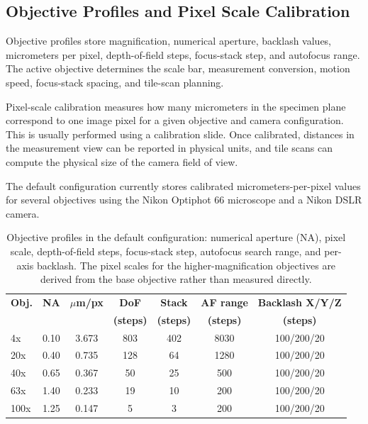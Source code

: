 \subsection{Objective Profiles and Pixel Scale Calibration}

Objective profiles store magnification, numerical aperture, backlash values, micrometers per pixel, depth-of-field steps, focus-stack step, and autofocus range. The active objective determines the scale bar, measurement conversion, motion speed, focus-stack spacing, and tile-scan planning.

Pixel-scale calibration measures how many micrometers in the specimen plane correspond to one image pixel for a given objective and camera configuration. This is usually performed using a calibration slide. Once calibrated, distances in the measurement view can be reported in physical units, and tile scans can compute the physical size of the camera field of view.

The default configuration currently stores calibrated micrometers-per-pixel values for several objectives using the Nikon Optiphot 66 microscope and a Nikon DSLR camera.

\begin{table}[H]
    \centering
    \caption[Objective profile calibration values]{Objective profiles in the default configuration: numerical aperture (NA), pixel scale,
    depth-of-field steps, focus-stack step, autofocus search range, and per-axis backlash. The pixel scales for the higher-magnification objectives are derived from the base objective rather than measured directly.}
    \label{tab:objectives}
    \begin{tabular}{@{}l c c c c c c@{}}
        \toprule
        \textbf{Obj.} & \textbf{NA} & \textbf{$\mu$m/px} & \textbf{DoF} & \textbf{Stack} &
        \textbf{AF range} & \textbf{Backlash X/Y/Z} \\
         & & & \textbf{(steps)} & \textbf{(steps)} & \textbf{(steps)} & \textbf{(steps)} \\
        \midrule
        4x   & 0.10 & 3.673 & 803 & 402 & 8030 & 100/200/20 \\
        20x  & 0.40 & 0.735 & 128 & 64  & 1280 & 100/200/20 \\
        40x  & 0.65 & 0.367 & 50  & 25  & 500  & 100/200/20 \\
        63x  & 1.40 & 0.233 & 19  & 10  & 200  & 100/200/20 \\
        100x & 1.25 & 0.147 & 5   & 3   & 200  & 100/200/20 \\
        \bottomrule
    \end{tabular}
\end{table}

